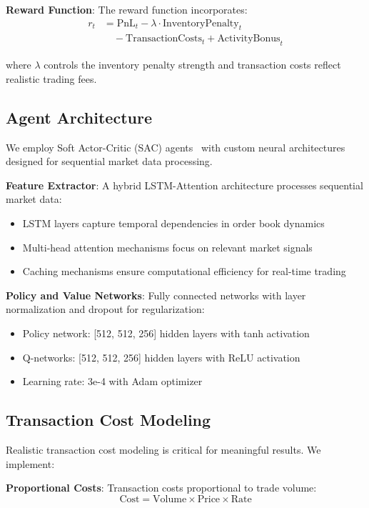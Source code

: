 \documentclass[11pt,a4paper]{article}
\begin{document}
\textbf{Reward Function}: The reward function incorporates:
\begin{align}
r_t &= \text{PnL}_{t} - \lambda \cdot \text{InventoryPenalty}_t \\
&\quad - \text{TransactionCosts}_t + \text{ActivityBonus}_t
\end{align}

where $\lambda$ controls the inventory penalty strength and transaction costs reflect realistic trading fees.

\subsection{Agent Architecture}

We employ Soft Actor-Critic (SAC) agents~\cite{haarnoja2018soft} with custom neural architectures designed for sequential market data processing.

\textbf{Feature Extractor}: A hybrid LSTM-Attention architecture processes sequential market data:
\begin{itemize}
\item LSTM layers capture temporal dependencies in order book dynamics
\item Multi-head attention mechanisms focus on relevant market signals
\item Caching mechanisms ensure computational efficiency for real-time trading
\end{itemize}

\textbf{Policy and Value Networks}: Fully connected networks with layer normalization and dropout for regularization:
\begin{itemize}
\item Policy network: [512, 512, 256] hidden layers with tanh activation
\item Q-networks: [512, 512, 256] hidden layers with ReLU activation
\item Learning rate: 3e-4 with Adam optimizer
\end{itemize}

\subsection{Transaction Cost Modeling}

Realistic transaction cost modeling is critical for meaningful results. We implement:

\textbf{Proportional Costs}: Transaction costs proportional to trade volume:
$$\text{Cost} = \text{Volume} \times \text{Price} \times \text{Rate}$$
\end{document}
